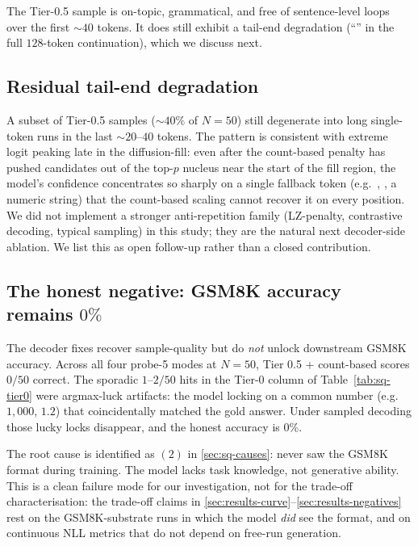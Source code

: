 The Tier-0.5 sample is on-topic, grammatical, and free of
sentence-level loops over the first $\sim 40$ tokens. It does still
exhibit a tail-end degradation (``''
in the full $128$-token continuation), which we discuss next.

\subsection{Residual tail-end degradation}
\label{sec:sq-residual}

A subset of Tier-0.5  samples ($\sim 40\%$ of
$N=50$) still degenerate into long single-token runs in the last
$\sim 20$--$40$ tokens. The pattern is consistent with extreme logit
peaking late in the diffusion-fill: even after the count-based penalty
has pushed candidates out of the top-$p$ nucleus near the start of
the fill region, the model's confidence concentrates so sharply on a
single fallback token (e.g.\ , , a numeric
string) that the count-based scaling cannot recover it on every
position. We did not implement a stronger anti-repetition family
(LZ-penalty, contrastive decoding, typical sampling) in this study;
they are the natural next decoder-side ablation. We list this as
open follow-up rather than a closed contribution.

\subsection{The honest negative: GSM8K accuracy remains $0\%$}
\label{sec:sq-acc}

The decoder fixes recover sample-quality but do \emph{not} unlock
downstream GSM8K accuracy. Across all four probe-5 modes at $N=50$,
Tier 0.5 + count-based  scores $0/50$ correct. The sporadic
$1$--$2/50$ hits in the Tier-0 column of Table~\ref{tab:sq-tier0}
were argmax-luck artifacts: the model locking on a common number
(e.g.\ $1{,}000$, $1.2$) that coincidentally matched the gold answer.
Under sampled decoding those lucky locks disappear, and the honest
accuracy is $0\%$.

The root cause is identified as $(2)$ in \textsection\ref{sec:sq-causes}:
 never saw the GSM8K  format during
training. The model lacks task knowledge, not generative ability.
This is a clean failure mode for our investigation, not for the
trade-off characterisation: the trade-off claims in
\textsection\ref{sec:results-curve}--\ref{sec:results-negatives} rest
on the GSM8K-substrate runs in which the model \emph{did} see the
 format, and on continuous NLL metrics that do not depend
on free-run generation.

